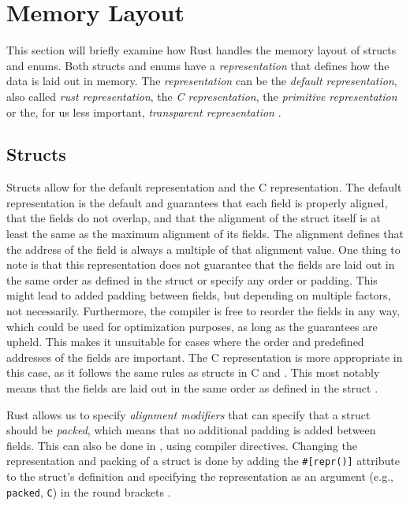 \section{Memory Layout}
This section will briefly examine how Rust handles the memory layout of structs and enums.
Both structs and enums have a \textit{representation} that defines how the data is laid out in memory.
The \textit{representation} can be the \textit{default representation}, also called \textit{rust representation}, the \textit{C representation}, the \textit{primitive representation} or the, for us less important, \textit{transparent representation} \cite[Chapter~10.3]{rustref}.


\subsection{Structs}
Structs allow for the default representation and the C representation.
The default representation is the default and guarantees that each field is properly aligned, that the fields do not overlap, and that the alignment of the struct itself is at least the same as the maximum alignment of its fields.
The alignment defines that the address of the field is always a multiple of that alignment value.
One thing to note is that this representation does not guarantee that the fields are laid out in the same order as defined in the struct or specify any order or padding.
This might lead to added padding between fields, but depending on multiple factors, not necessarily.
Furthermore, the compiler is free to reorder the fields in any way, which could be used for optimization purposes, as long as the guarantees are upheld.
This makes it unsuitable for cases where the order and predefined addresses of the fields are important.
The C representation is more appropriate in this case, as it follows the same rules as structs in C and \Cpp. This most notably means that the fields are laid out in the same order as defined in the struct \cite[308-310]{Stroustrup_Bjarne2014-05-15}.

Rust allows us to specify \textit{alignment modifiers} that can specify that a struct should be \textit{packed}, which means that no additional padding is added between fields.
This can also be done in \Cpp, using compiler directives.
Changing the representation and packing of a struct is done by adding the \texttt{\#[repr()]} attribute to the struct's definition and specifying the representation as an argument (e.g., \texttt{packed}, \texttt{C}) in the round brackets \cite[213-214]{Blandy_Jim2021-07-20} \cite[Chapter~10.3]{rustref}.


